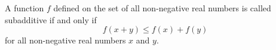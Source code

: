 A function $f$ defined on the set of all non-negative real numbers is called subadditive if and only if
$$f(x + y) \leq f(x) + f(y)$$
for all non-negative real numbers $x$ and $y$.
